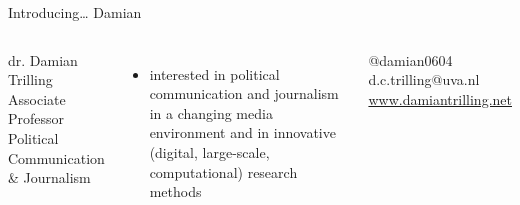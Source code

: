 \documentclass[handout]{beamer}
\begin{document}
\begin{frame}{Introducing\ldots} {\huge{Damian}} \small{} 

\begin{columns}
	dr. Damian Trilling \\
	Associate Professor Political Communication \& Journalism \\
	\begin{itemize}
		\item interested in political communication and journalism in a changing media environment and in innovative (digital, large-scale, computational) research methods
	\end{itemize}
	@damian0604 \textbar d.c.trilling@uva.nl \textbar \url{www.damiantrilling.net} 
\end{columns}
\end{frame}
\end{document}
